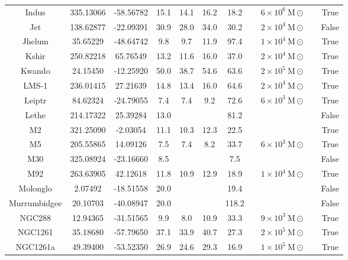 \begin{table}
\begin{tabular}{ccccccccccc}
Indus & 335.13066 & -58.56782 & 15.1 & 14.1 & 16.2 & 18.2 & \citet{shipp:2019} & $6 \times 10^{6}~\mathrm{M}\odot$ & \citet{shipp:2018} & True \\
Jet & 138.62877 & -22.09391 & 30.9 & 28.0 & 34.0 & 30.2 & \citet{ferguson:2022} & $2 \times 10^{4}~\mathrm{M}\odot$ & \citet{jethwa:2018} & False \\
Jhelum & 35.65229 & -48.64742 & 9.8 & 9.7 & 11.9 & 97.4 & \citet{ibata:2023} & $1 \times 10^{4}~\mathrm{M}\odot$ &  & True \\
Kshir & 250.82218 & 65.76549 & 13.2 & 11.6 & 16.0 & 37.0 & \citet{ibata:2023} & $2 \times 10^{4}~\mathrm{M}\odot$ &  & True \\
Kwando & 24.15450 & -12.25920 & 50.0 & 38.7 & 54.6 & 63.6 & \citet{ibata:2023} & $2 \times 10^{5}~\mathrm{M}\odot$ &  & True \\
LMS-1 & 236.01415 & 27.21639 & 14.8 & 13.4 & 16.0 & 64.6 & \citet{ibata:2023} & $2 \times 10^{4}~\mathrm{M}\odot$ &  & True \\
Leiptr & 84.62324 & -24.79055 & 7.4 & 7.4 & 9.2 & 72.6 & \citet{ibata:2023} & $6 \times 10^{3}~\mathrm{M}\odot$ &  & True \\
Lethe & 214.17322 & 25.39284 & 13.0 & & & 81.2 & \citet{grillmair:2009} & &  & False \\
M2 & 321.25090 & -2.03054 & 11.1 & 10.3 & 12.3 & 22.5 & \citet{ibata:2021} & &  & True \\
M5 & 205.55865 & 14.09126 & 7.5 & 7.4 & 8.2 & 33.7 & \citet{ibata:2023} & $6 \times 10^{3}~\mathrm{M}\odot$ &  & True \\
M30 & 325.08924 & -23.16660 & 8.5 & & & 7.5 & \citet{sollima:2020} & &  & False \\
M92 & 263.63905 & 42.12618 & 11.8 & 10.9 & 12.9 & 18.9 & \citet{ibata:2023} & $1 \times 10^{4}~\mathrm{M}\odot$ &  & True \\
Molonglo & 2.07492 & -18.51558 & 20.0 & & & 19.4 & \citet{grillmair:2017b} & &  & False \\
Murrumbidgee & 20.10703 & -40.08947 & 20.0 & & & 118.2 & \citet{grillmair:2017b} & &  & False \\
NGC288 & 12.94365 & -31.51565 & 9.9 & 8.0 & 10.9 & 33.3 & \citet{ibata:2023} & $9 \times 10^{3}~\mathrm{M}\odot$ &  & True \\
NGC1261 & 35.18680 & -57.79650 & 37.1 & 33.9 & 40.7 & 27.3 & \citet{ibata:2023} & $2 \times 10^{5}~\mathrm{M}\odot$ &  & True \\
NGC1261a & 49.39400 & -53.52350 & 26.9 & 24.6 & 29.3 & 16.9 & \citet{ibata:2023} & $1 \times 10^{5}~\mathrm{M}\odot$ &  & True \\

\end{tabular}
\end{table}
